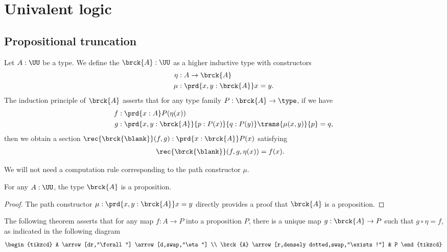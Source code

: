 \chapter{Univalent logic}


\section{Propositional truncation}

\begin{defn}
Let $A:\UU$ be a type. We define the  $\brck{A}:\UU$ as a higher inductive type with constructors
\begin{align*}
\eta & : A\to \brck{A} \\
\mu & : \prd{x,y:\brck{A}} x=y.
\end{align*}
The induction principle of $\brck{A}$ asserts that for any type family $P:\brck{A}\to\type$, if we have
\begin{align*}
f & : \prd{x:A}P(\eta(x)) \\
g & : \prd{x,y:\brck{A}}{p:P(x)}{q:P(y)} \trans{\mu(x,y)}{p}=q,
\end{align*}
then we obtain a section $\rec{\brck{\blank}}(f,g):\prd{x:\brck{A}}P(x)$ satisfying
\begin{align*}
\rec{\brck{\blank}}(f,g,\eta(x)) & = f(x).
\end{align*}
\end{defn}

\begin{rmk}
We will not need a computation rule corresponding to the path constructor $\mu$.
\end{rmk}

\begin{lem}
For any $A:\UU$, the type $\brck{A}$ is a proposition.
\end{lem}

\begin{proof}
The path constructor $\mu:\prd{x,y:\brck{A}}x=y$ directly provides a proof that $\brck{A}$ is a proposition.
\end{proof}

The following theorem asserts that for any map $f:A\to P$ into a proposition $P$, there is a unique map $g:\brck{A}\to P$ such that $g\circ\eta=f$, as indicated in the following diagram
\begin{equation*}
\begin{tikzcd}
A \arrow[dr,"\forall"] \arrow[d,swap,"\eta"] \\
\brck{A} \arrow[r,densely dotted,swap,"\exists!"] & P
\end{tikzcd}
\end{equation*}

